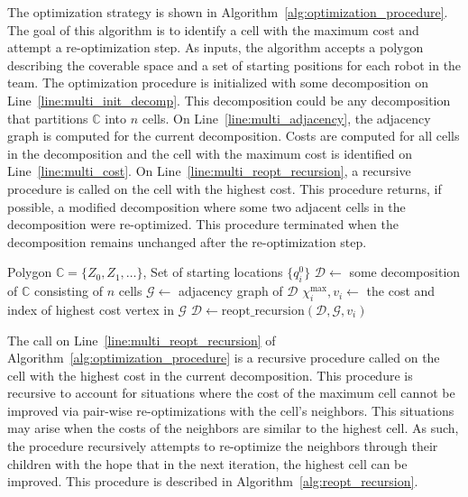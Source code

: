 \documentclass[../main.tex]{subfiles}
\begin{document}
The optimization strategy is shown in Algorithm~\ref{alg:optimization_procedure}. The goal of this algorithm is to identify a cell with the maximum cost and attempt a re-optimization step. As inputs, the algorithm accepts a polygon describing the coverable space and a set of starting positions for each robot in the team. The optimization procedure is initialized with some decomposition on Line~\ref{line:multi_init_decomp}. This decomposition could be any decomposition that partitions $\mathbb{C}$ into $n$ cells. On Line~\ref{line:multi_adjacency}, the adjacency graph is computed for the current decomposition. Costs are computed for all cells in the decomposition and the cell with the maximum cost is identified on Line~\ref{line:multi_cost}. On Line~\ref{line:multi_reopt_recursion}, a recursive procedure is called on the cell with the highest cost. This procedure returns, if possible, a modified decomposition where some two adjacent cells in the decomposition were re-optimized. This procedure terminated when the decomposition remains unchanged after the re-optimization step.

\begin{algorithm}
	\caption{$\text{optimization\_procedure}(\mathbb{C}, \{q^0_i\})$}
	\label{alg:optimization_procedure}
	\begin{algorithmic}[1]
		\REQUIRE Polygon $\mathbb{C}=\{Z_0,Z_1,\ldots\}$, Set of starting locations $\{q^0_i\}$
			\STATE $\mathcal{D}\gets$ some decomposition of $\mathbb{C}$ consisting of $n$ cells \label{line:multi_init_decomp}
			\REPEAT
			\STATE $\mathcal{G}\gets$ adjacency graph of $\mathcal{D}$ \label{line:multi_adjacency}
			\STATE $\chi^{\max}_i,v_i\gets$ the cost and index of highest cost vertex in $\mathcal{G}$ \label{line:multi_cost}
			\STATE $\mathcal{D}\gets\text{reopt\_recursion}(\mathcal{D},\mathcal{G}, v_i)$ \label{line:multi_reopt_recursion}
	\end{algorithmic}
\end{algorithm}

The call on Line~\ref{line:multi_reopt_recursion} of Algorithm~\ref{alg:optimization_procedure} is a recursive procedure called on the cell with the highest cost in the current decomposition. This procedure is recursive to account for situations where the cost of the maximum cell cannot be improved via pair-wise re-optimizations with the cell's neighbors. This situations may arise when the costs of the neighbors are similar to the highest cell. As such, the procedure recursively attempts to re-optimize the neighbors through their children with the hope that in the next iteration, the highest cell can be improved. This procedure is described in Algorithm~\ref{alg:reopt_recursion}.
\end{document}
